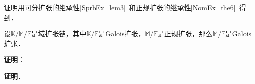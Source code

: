 证明用可分扩张的继承性\autoref{SprbEx_lem3}~和正规扩张的继承性\autoref{NomEx_the6}~得到．

\begin{theorem}{}
设$\mathbb{K}/\mathbb{M}/\mathbb{F}$是域扩张链，其中$\mathbb{K}/\mathbb{F}$是Galois扩张，$\mathbb{M}/\mathbb{F}$是正规扩张，那么$\mathbb{M}/\mathbb{F}$是Galois扩张．
\end{theorem}

\textbf{证明}：



\textbf{证明}．













